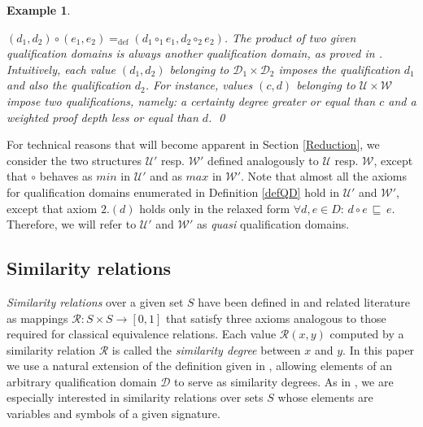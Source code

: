 \documentclass{sigplanconf}
\newcommand{\qdom}{\mathcal{D}} \newcommand{\dqdom}{D \setminus \{\bot\}} \newcommand{\bqdom}{(D \setminus \{\bot\}) \uplus \{?\}}
\newcommand{\U}{\mathcal{U}}
\newcommand{\W}{\mathcal{W}}
\newcommand{\simrel}{\mathcal{R}}
\theoremstyle{definition}
\theoremstyle{plain}
\newtheorem{example}{Example}
\begin{document}
\begin{example}
\begin{enumerate}
$(d_1,d_2) \circ (e_1,e_2) =_{\mathrm{def}} (d_1 \circ_1 e_1, d_2 \circ_2 e_2)$. The product of two given qualification domains is always another  qualification domain, as proved in \cite{RR08}. Intuitively, each value $(d_1,d_2)$ belonging to $\qdom_1 \times \qdom_2$ imposes the qualification $d_1$ {\em and also} the qualification $d_2$. For instance, values $(c,d)$ belonging to $\U \times \W$ impose two qualifications, namely: a certainty degree greater or equal than $c$ and a weighted proof depth less or equal than $d$. \qed
\end{enumerate}
\end{example}

For technical reasons that will become apparent in Section \ref{Reduction}, we consider the two structures $\U'$ resp. $\W'$ defined analogously to  $\U$ resp. $\W$, except that $\circ$ behaves as $min$ in $\U'$ and as $max$ in $\W'$. Note that almost all the axioms for qualification domains enumerated in Definition \ref{defQD} hold in $\U'$ and $\W'$, except that axiom $2. (d)$ holds only in the relaxed form
$\forall d, e \in D:\, d \circ e\, \sqsubseteq\, e$. Therefore, we will refer to $\U'$ and $\W'$ as {\em quasi} qualification domains.

\subsection{Similarity relations} \label{SR}

{\em Similarity relations} over a given set $S$  have been defined in \cite{Ses02} and related literature as mappings $\simrel : S \times S \to [0,1]$ that satisfy three axioms analogous to those required for classical equivalence relations. Each value $\simrel(x,y)$ computed by a similarity relation $\simrel$ is called the {\em similarity  degree} between $x$ and $y$. In this paper we use a natural extension of the definition given in \cite{Ses02}, allowing elements of an arbitrary qualification domain $\qdom$  to serve as similarity degrees. As in \cite{Ses02}, we  are especially interested in similarity relations over sets $S$ whose elements are variables and symbols of a given signature.
\end{document}
